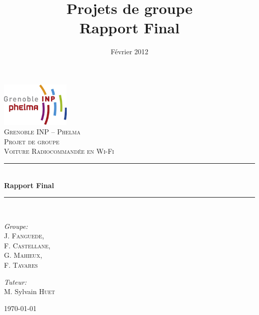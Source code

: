 \documentclass[a4paper,12pt]{report}
\title{Projets de groupe \\ Rapport Final}
\author{\bsc{J. Fanguede} \and \bsc{F. Castellane} \and \bsc{G. Mahieux} \and \bsc{F. Tavares}  }
\date{Février 2012}
\newcommand{\HRule}{\rule{\linewidth}{0.5mm}}
\begin{document}
\begin{titlepage}
	\begin{center}
	
	\includegraphics[width=0.25\textwidth]{images/smallphelma.png}\\[1.0cm]    

	\textsc{\Large Grenoble INP -- Phelma}\\[0.5cm]

	\textsc{\huge Projet de groupe}\\[3.5cm]

	\textsc{\huge Voiture Radiocommandée en Wi-Fi}\\[0.6cm]
	
	\HRule \\[0.4cm]
	{ \huge \bfseries Rapport Final}\\[0.1cm]

	\HRule \\[3.5cm]
	

	\begin{minipage}{0.3\textwidth}
		\begin{flushleft} \large
			\emph{Groupe:}\\
			J. \textsc{Fanguede}, \\ F. \textsc{Castellane}, \\ G. \textsc{Mahieux}, \\ F. \textsc{Tavares}
		\end{flushleft}
	\end{minipage}
	\begin{minipage}{0.4\textwidth}
		\begin{flushright} \large
			\emph{Tuteur:} \\
			M. Sylvain \textsc{Huet}
		\end{flushright}
	\end{minipage}
	\vfill

{\large \today}

\end{center}

\end{titlepage}

\end{document}
